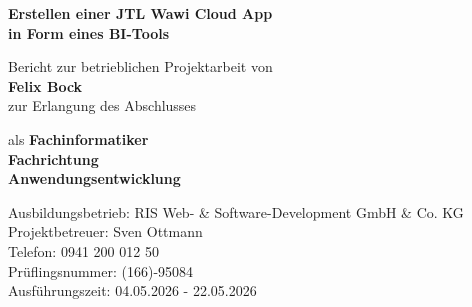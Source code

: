 \documentclass[11pt, a4paper, oneside]{report}
\newcommand{\AutorName}{Felix Bock}
\newcommand{\Prueflingsnummer}{(166)-95084}
\newcommand{\PruefungsZeitraum}{04.05.2026 - 22.05.2026}
\newcommand{\Ausbildungsbetrieb}{RIS Web- \& Software-Development GmbH \& Co. KG}
\newcommand{\BetreuerName}{Sven Ottmann}
\newcommand{\BetreuerTelefon}{0941 200 012 50}
\begin{document}
\pagestyle{empty}

\begin{titlepage}
  \centering
  \vspace*{3cm}

  {\LARGE\bfseries Erstellen einer JTL Wawi Cloud App\\[0.4cm]
                   in Form eines BI-Tools}

  \vspace{3cm}

  {\normalsize Bericht zur betrieblichen Projektarbeit von}\\[0.5cm]
  {\large\bfseries \AutorName}\\[0.5cm]
  {\normalsize zur Erlangung des Abschlusses}

  \vspace{1.8cm}

  {\normalsize als \textbf{Fachinformatiker}}\\[0.25cm]
  {\normalsize\bfseries Fachrichtung}\\[0.25cm]
  {\normalsize\bfseries Anwendungsentwicklung}

  \vfill

  {\color{ihkblue}\normalsize
    Ausbildungsbetrieb: \Ausbildungsbetrieb\\[0.2cm]
    Projektbetreuer: \BetreuerName\\[0.2cm]
    Telefon: \BetreuerTelefon\\[0.2cm]
    Prüflingsnummer: \Prueflingsnummer\\[0.2cm]
    Ausführungszeit: \PruefungsZeitraum
  }

  \vspace{1.5cm}
\end{titlepage}

\cleardoublepage
\pagestyle{main}

{\singlespacing\tableofcontents}
\end{document}
